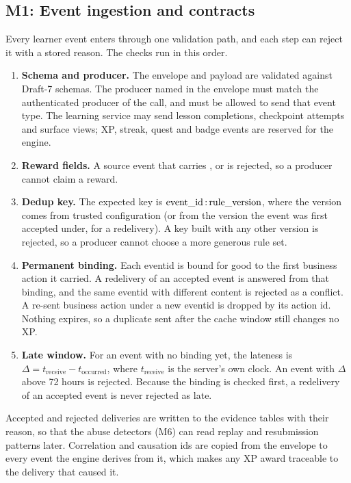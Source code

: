 \documentclass[11pt,a4paper]{article}
\renewcommand{\_}{\textunderscore\allowbreak{}}
\begin{document}
\subsection{M1: Event ingestion and contracts}

Every learner event enters through one validation path, and each step can reject it with a stored reason. The checks run in this order.

\begin{enumerate}[leftmargin=2em]
    \item \textbf{Schema and producer.} The envelope and payload are validated against Draft-7 schemas. The producer named in the envelope must match the authenticated producer of the call, and must be allowed to send that event type. The learning service may send lesson completions, checkpoint attempts and surface views; XP, streak, quest and badge events are reserved for the engine.
    \item \textbf{Reward fields.} A source event that carries ,  or  is rejected, so a producer cannot claim a reward.
    \item \textbf{Dedup key.} The expected key is $\text{event\_id}\,{:}\,\text{rule\_version}$, where the version comes from trusted configuration (or from the version the event was first accepted under, for a redelivery). A key built with any other version is rejected, so a producer cannot choose a more generous rule set.
    \item \textbf{Permanent binding.} Each event\_id is bound for good to the first business action it carried. A redelivery of an accepted event is answered from that binding, and the same event\_id with different content is rejected as a conflict. A re-sent business action under a new event\_id is dropped by its action id. Nothing expires, so a duplicate sent after the cache window still changes no XP.
    \item \textbf{Late window.} For an event with no binding yet, the lateness is $\Delta = t_{\text{receive}} - t_{\text{occurred}}$, where $t_{\text{receive}}$ is the server's own clock. An event with $\Delta$ above 72 hours is rejected. Because the binding is checked first, a redelivery of an accepted event is never rejected as late.
\end{enumerate}

Accepted and rejected deliveries are written to the evidence tables with their reason, so that the abuse detectors (M6) can read replay and resubmission patterns later. Correlation and causation ids are copied from the envelope to every event the engine derives from it, which makes any XP award traceable to the delivery that caused it.
\end{document}
